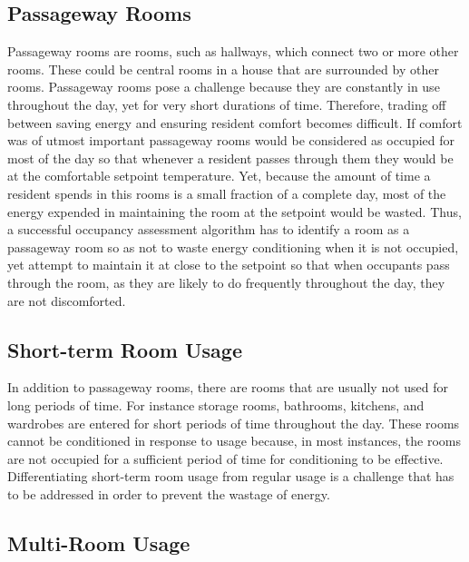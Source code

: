 \subsection{Passageway Rooms}
Passageway rooms are rooms, such as hallways, which connect two or more other
rooms. These could be central rooms in a house that are surrounded by other
rooms. Passageway rooms pose a challenge because they are constantly in use
throughout the day, yet for very short durations of time. Therefore, trading off
between saving energy and ensuring resident comfort becomes difficult. If
comfort was of utmost important passageway rooms would be considered as occupied
for most of the day so that whenever a resident passes through them they would
be at the comfortable setpoint temperature. Yet, because the amount of time a
resident spends in this rooms is a small fraction of a complete day, most of the
energy expended in maintaining the room at the setpoint would be
wasted. Thus, a successful occupancy assessment algorithm has to identify a room
as a passageway room so as not to waste energy conditioning when it is not
occupied, yet attempt to maintain it at close to the setpoint so that when
occupants pass through the room, as they are likely to do frequently throughout
the day, they are not discomforted. 

\subsection{Short-term Room Usage}


In addition to passageway rooms, there are rooms that are usually not used for
long periods of time. For instance storage rooms, bathrooms, kitchens, and
wardrobes are entered for short periods of time throughout the day. These rooms
cannot be conditioned in response to usage because, in most instances, the rooms
are not occupied for a sufficient period of time for conditioning to be
effective. Differentiating short-term room usage from regular usage is a
challenge that has to be addressed in order to prevent the wastage of energy.

\subsection{Multi-Room Usage}


